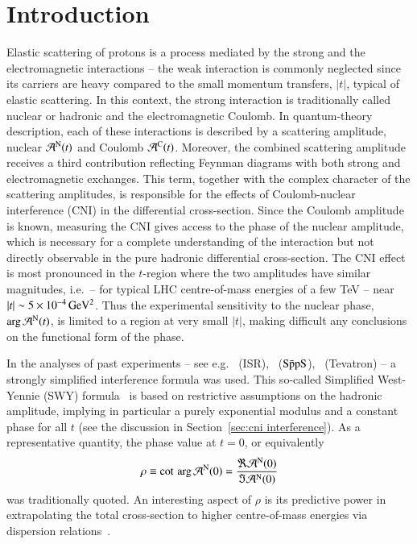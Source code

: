 \section{Introduction}
\label{sec:introduction}

Elastic scattering of protons is a process mediated by the strong and the electromagnetic interactions -- the weak interaction is commonly neglected since its carriers are heavy compared to the small momentum transfers, $|t|$, typical of elastic scattering. In this context, the strong interaction is traditionally called nuclear or hadronic and the electromagnetic Coulomb. In quantum-theory description, each of these interactions is described by a scattering amplitude, nuclear ${\cal A}^{\rm N}(t)$ and Coulomb ${\cal A}^{\rm C}(t)$. Moreover, the combined scattering amplitude receives a third contribution reflecting Feynman diagrams with both strong and electromagnetic exchanges. This term, together with the complex character of the scattering amplitudes, is responsible for the effects of Coulomb-nuclear interference (CNI) in the differential cross-section. Since the Coulomb amplitude is known, measuring the CNI gives access to the phase of the nuclear amplitude, which is necessary for a complete understanding of the interaction but not directly observable in the pure hadronic differential cross-section. The CNI effect is most pronounced in the $t$-region where the two amplitudes have similar magnitudes, i.e.~-- for typical LHC centre-of-mass energies of a few TeV -- near $|t| \sim 5 \times 10^{-4}\,\rm GeV^{2}$. Thus the experimental sensitivity to the nuclear phase, $\arg {\cal A}^{\rm N}(t)$, is limited to a region at very small $|t|$, making difficult any conclusions on the 
functional form of the phase.

In the analyses of past experiments -- see e.g.~\cite{plb43,plb66,npb141,prl47,plb115,plb120,plb128,npb262} 
(ISR),~\cite{plb198,plb316} ($\rm S\bar{p}pS$),~\cite{prl68} (Tevatron) --
a strongly simplified interference formula was used. This so-called
Simplified West-Yennie (SWY) formula~\cite{wy68} is based on restrictive assumptions on the 
hadronic amplitude, implying in particular a purely exponential modulus and a 
constant phase for all $t$ (see the discussion in 
Section~\ref{sec:cni interference}).
As a representative quantity, the phase value at $t=0$, or equivalently
\begin{equation}
\label{eq:rho def}
\rho \equiv \cot \, \arg {\cal A}^{\rm N} (0) = \frac{\Re {\cal A}^{\rm N} (0)}{\Im {\cal A}^{\rm N} (0)}
\end{equation}
was traditionally quoted. 
An interesting aspect of $\rho$ is its predictive power in extrapolating the total cross-section to higher centre-of-mass energies via dispersion 
relations~\cite{dremin-dispersion}. 

